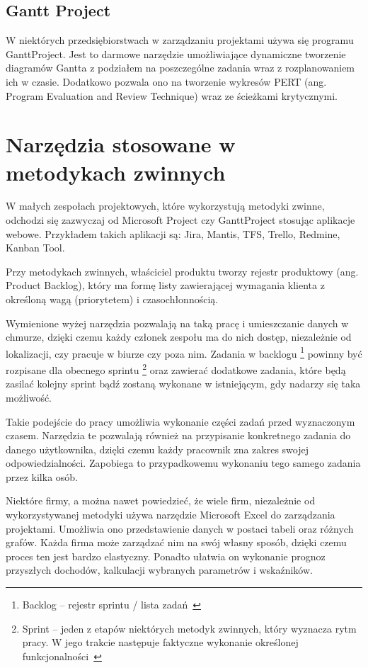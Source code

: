 \subsection{Gantt Project}

W niektórych przedsiębiorstwach w zarządzaniu projektami używa się programu GanttProject.
Jest to darmowe narzędzie umożliwiające dynamiczne tworzenie diagramów Gantta
z podziałem na poszczególne zadania wraz z rozplanowaniem ich w czasie.
Dodatkowo pozwala ono na tworzenie wykresów PERT (ang. Program Evaluation and Review Technique)
wraz ze ścieżkami krytycznymi.
~\cite{Trendy_Zarzadzanie}

\section{Narzędzia stosowane w metodykach zwinnych}

W małych zespołach projektowych, które wykorzystują metodyki zwinne,
odchodzi się zazwyczaj od Microsoft Project czy GanttProject stosując aplikacje webowe.
Przykładem takich aplikacji są: Jira, Mantis, TFS, Trello, Redmine, Kanban Tool.

Przy metodykach zwinnych, właściciel produktu tworzy rejestr produktowy (ang. Product Backlog),
który ma formę listy zawierającej wymagania klienta z określoną wagą (priorytetem) i czasochłonnością.
~\cite{Shwaber_2004}

Wymienione wyżej narzędzia pozwalają na taką pracę i umieszczanie danych w chmurze,
dzięki czemu każdy członek zespołu ma do nich dostęp,
niezależnie od lokalizacji, czy pracuje w biurze czy poza nim.
Zadania w backlogu
\footnote{Backlog – rejestr sprintu / lista zadań~\cite{metody_zwinne_2016}}
powinny być rozpisane dla obecnego sprintu
\footnote{Sprint – jeden z etapów niektórych metodyk zwinnych, który wyznacza rytm pracy. W jego
trakcie następuje faktyczne wykonanie określonej funkcjonalności~\cite{Samoorganizacja_2010}}
oraz zawierać dodatkowe zadania, które będą zasilać kolejny sprint bądź zostaną wykonane w istniejącym,
gdy nadarzy się taka możliwość.

Takie podejście do pracy umożliwia wykonanie części zadań przed wyznaczonym czasem.
Narzędzia te pozwalają również na przypisanie konkretnego zadania do danego użytkownika,
dzięki czemu każdy pracownik zna zakres swojej odpowiedzialności.
Zapobiega to przypadkowemu wykonaniu tego samego zadania przez kilka osób.

Niektóre firmy, a można nawet powiedzieć, że wiele firm,
niezależnie od wykorzystywanej metodyki używa narzędzie Microsoft Excel do zarządzania projektami.
Umożliwia ono przedstawienie danych w postaci tabeli oraz różnych grafów.
Każda firma może zarządzać nim na swój własny sposób, dzięki czemu proces ten jest bardzo elastyczny.
Ponadto ułatwia on wykonanie prognoz przyszłych dochodów, kalkulacji wybranych parametrów i wskaźników.

